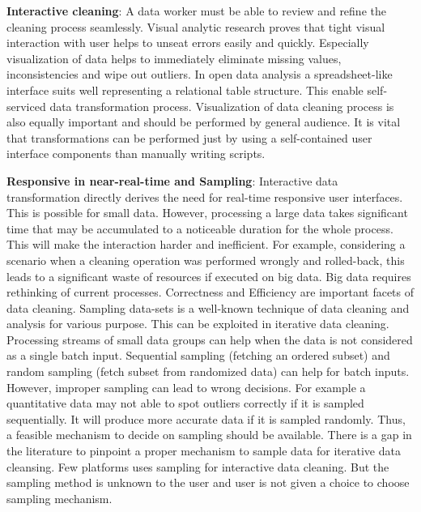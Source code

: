 \textbf{Interactive cleaning}: A data worker must be able to review and refine the cleaning process seamlessly. Visual analytic research\cite{Keim08visualanalytics:} proves that tight visual interaction with user helps to unseat errors easily and quickly. Especially visualization of data helps to immediately eliminate missing values, inconsistencies and wipe out outliers\cite{visualizationsandtransformationsinwrangling}.  In open data analysis a spreadsheet-like interface suits well representing a relational table structure. This enable self-serviced data transformation process. Visualization of data cleaning process is also equally important and should be performed by general audience. It is vital that transformations can be performed just by using a self-contained user interface components than manually writing scripts. 

\textbf{Responsive in near-real-time  and Sampling}: Interactive data transformation directly derives the need for real-time responsive user interfaces. This is possible for small data. However, processing a large data takes significant time that may be accumulated to a noticeable duration for the whole process. This will make the interaction harder and inefficient. For example, considering a scenario when a cleaning operation was performed wrongly and rolled-back, this leads to a significant waste of resources if executed on big data. Big data requires rethinking of current processes\cite{nemreport}. Correctness and Efficiency are important facets of data cleaning\cite{journals/corr/KrishnanW0FG16}. Sampling data-sets is a well-known technique of data cleaning and analysis\cite{Hellerstein08quantitativedata} for various purpose. This can be exploited in iterative data cleaning. Processing streams of small data groups can help when the data is not considered as a single batch input\cite{nemreport}. Sequential sampling (fetching an ordered subset) and random sampling (fetch subset from randomized data) can help for batch inputs. However, improper sampling can lead to wrong decisions\cite{journals/corr/KrishnanW0FG16}. For example a quantitative data may not able to spot outliers correctly if it is sampled sequentially. It will produce more accurate data if it is sampled randomly\cite{Hellerstein08quantitativedata}. Thus, a feasible mechanism to decide on sampling should be available. There is a gap in the literature to pinpoint a proper mechanism to sample data for iterative data cleansing. Few platforms\cite{2011-wrangler} \cite{Wisteria} uses sampling for interactive data cleaning. But the sampling method is unknown to the user and user is not given a choice to choose sampling mechanism.

